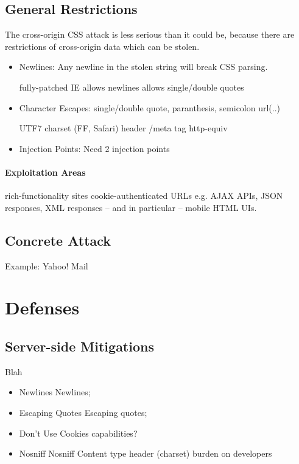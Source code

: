 \documentclass{acm_proc_article-sp}
\begin{document}
\subsection{General Restrictions}
The cross-origin CSS attack is less serious than it could be, because there are restrictions of cross-origin data which can be stolen.
\begin{itemize}

\item{Newlines:}
Any newline in the stolen string will break CSS parsing.

fully-patched IE
allows newlines
allows single/double quotes


\item{Character Escapes:}
single/double quote,
paranthesis, semicolon
url(..)

UTF7 charset (FF, Safari)
header /meta tag http-equiv
\cite{cssxss}


\item{Injection Points:}
Need 2 injection points
\end{itemize}

\paragraph{Exploitation Areas}
rich-functionality sites
cookie-authenticated URLs
e.g. AJAX APIs, JSON responses, XML responses -- and in particular -- mobile HTML UIs.


\subsection{Concrete Attack}
Example: Yahoo! Mail

\section{Defenses}

\subsection{Server-side Mitigations}
Blah
\begin{itemize}
\item{Newlines}
Newlines;
\item{Escaping Quotes}
Escaping quotes;
\item{Don't Use Cookies}
capabilities?
\item{Nosniff}
Nosniff
Content type header (charset)
burden on developers
\end{itemize}
\end{document}

